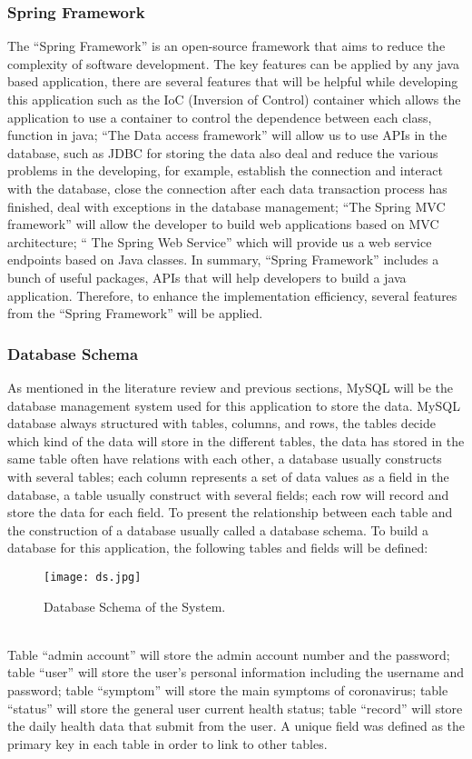 \documentclass[12pt]{article}
\begin{document}
\subsubsection{Spring Framework}
The ``Spring Framework'' is an open-source framework that aims to reduce the complexity of software development. The key features can be applied by any java based application, there are several features that will be helpful while developing this application such as the IoC (Inversion of Control) container which allows the application to use a container to control the dependence between each class, function in java; ``The Data access framework'' will allow us to use APIs in the database, such as JDBC for storing the data also deal and reduce the various problems in the developing, for example, establish the connection and interact with the database, close the connection after each data transaction process has finished, deal with exceptions in the database management; ``The Spring MVC framework'' will allow the developer to build web applications based on MVC architecture; `` The Spring Web Service'' which will provide us a web service endpoints based on Java classes. In summary, ``Spring Framework'' includes a bunch of useful packages, APIs that will help developers to build a java application. Therefore, to enhance the implementation efficiency, several features from the ``Spring Framework'' will be applied.
\subsubsection{Database Schema}
As mentioned in the literature review and previous sections, MySQL will be the database management system used for this application to store the data. MySQL database always structured with tables, columns, and rows, the tables decide which kind of the data will store in the different tables, the data has stored in the same table often have relations with each other, a database usually constructs with several tables; each column represents a set of data values as a field in the database, a table usually construct with several fields; each row will record and store the data for each field. To present the relationship between each table and the construction of a database usually called a database schema. To build a database for this application, the following tables and fields will be defined:
\begin{figure}[ht]
\centering
\texttt{[image: ds.jpg]}
\caption{Database Schema of the System.}
\label{fig:label}
\end{figure}
\\Table ``admin account'' will store the admin account number and the password; table ``user'' will store the user's personal information including the username and password; table ``symptom'' will store the main symptoms of coronavirus; table ``status'' will store the general user current health status; table ``record'' will store the daily health data that submit from the user. A unique field was defined as the primary key in each table in order to link to other tables.
\end{document}

